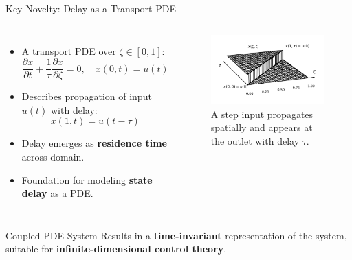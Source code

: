 \documentclass[8pt]{beamer}
\let\oldcitep\citep
\renewcommand{\citep}[1]{\textcolor{gray}{\oldcitep{#1}}}
\begin{document}
\begin{frame}{Key Novelty: Delay as a Transport PDE}
\begin{columns}[c]

\begin{itemize}
    \item A transport PDE over \( \zeta \in [0, 1] \):
    \[
        \frac{\partial x}{\partial t} + \frac{1}{\tau} \frac{\partial x}{\partial \zeta} = 0, \quad
        x(0, t) = u(t)
    \]
    \item Describes propagation of input \( u(t) \) with delay:
    \[
        x(1, t) = u(t - \tau)
    \]
    \item Delay emerges as \textbf{residence time} across domain.
    \item Foundation for modeling \textbf{state delay} as a PDE. \citep{krstic2009book}
\end{itemize}

\begin{figure}
    \centering
    \includegraphics[width=\linewidth]{figures/transport_delay.png}
    \caption{A step input propagates spatially and appears at the outlet with delay \(\tau\).}
\end{figure}
\end{columns}

\begin{block}{Coupled PDE System}
    Results in a \textbf{time-invariant} representation of the system, suitable for \textbf{infinite-dimensional control theory}.
\end{block}

\end{frame}
\end{document}
